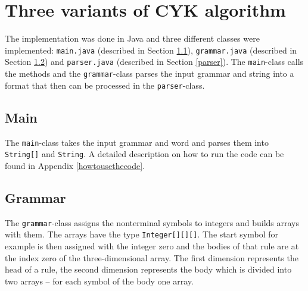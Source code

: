 \documentclass[a4paper, 11pt]{article}
\begin{document}



\pagebreak













\section{Three variants of CYK algorithm}
\label{systemdesign}

The implementation was done in Java and three different classes were implemented: \texttt{main.java} (described in Section \ref{main}), \texttt{grammar.java} (described in Section \ref{grammar}) and \texttt{parser.java} (described in Section \ref{parser}). The \texttt{main}-class calls the methods and the \texttt{grammar}-class parses the input grammar and string into a format that then can be processed in the \texttt{parser}-class.





\subsection{Main}
\label{main}

The \texttt{main}-class takes the input grammar and word and parses them into \texttt{String[]} and \texttt{String}. 
A detailed description on how to run the code can be found in Appendix \ref{howtousethecode}.



\subsection{Grammar}
\label{grammar}


The \texttt{grammar}-class assigns the nonterminal symbols to integers and builds arrays with them. The arrays have the type \texttt{Integer[][][]}. The start symbol for example is then assigned with the integer zero and the bodies of that rule are at the index zero of the three-dimensional array. The first dimension represents the head of a rule, the second dimension represents the body which is divided into two arrays -- for each symbol of the body one array.
\end{document}

